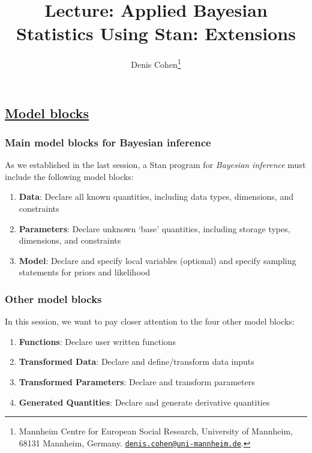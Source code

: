 \documentclass[
  11pt,
]{article}
\title{Lecture: Applied Bayesian Statistics Using Stan: Extensions}
\author{Denis Cohen\footnote{Mannheim Centre for European Social Research, University of Mannheim, 68131 Mannheim, Germany. \href{mailto:denis.cohen@uni-mannheim.de}{\nolinkurl{denis.cohen@uni-mannheim.de}}.}}
\date{}
\providecommand{\tightlist}{%
  \setlength{\itemsep}{0pt}\setlength{\parskip}{0pt}}
\begin{document}
\maketitle

\hypertarget{model-blocks}{%
\subsection{\texorpdfstring{\href{https://mc-stan.org/docs/2_26/reference-manual/blocks-chapter.html}{Model blocks}}{Model blocks}}\label{model-blocks}}

\hypertarget{main-model-blocks-for-bayesian-inference}{%
\subsubsection{Main model blocks for Bayesian inference}\label{main-model-blocks-for-bayesian-inference}}

As we established in the last session, a Stan program for \emph{Bayesian inference} must include the following model blocks:

\begin{enumerate}
\def\labelenumi{\arabic{enumi}.}
\tightlist
\item
  \textbf{Data}: Declare all known quantities, including data types, dimensions, and constraints
\item
  \textbf{Parameters}: Declare unknown `base' quantities, including storage types, dimensions, and constraints
\item
  \textbf{Model}: Declare and specify local variables (optional) and specify sampling statements for priors and likelihood
\end{enumerate}

\hypertarget{other-model-blocks}{%
\subsubsection{Other model blocks}\label{other-model-blocks}}

In this session, we want to pay closer attention to the four other model blocks:

\begin{enumerate}
\def\labelenumi{\arabic{enumi}.}
\tightlist
\item
  \textbf{Functions}: Declare user written functions
\item
  \textbf{Transformed Data}: Declare and define/transform data inputs
\item
  \textbf{Transformed Parameters}: Declare and transform parameters
\item
  \textbf{Generated Quantities}: Declare and generate derivative quantities
\end{enumerate}
\end{document}
